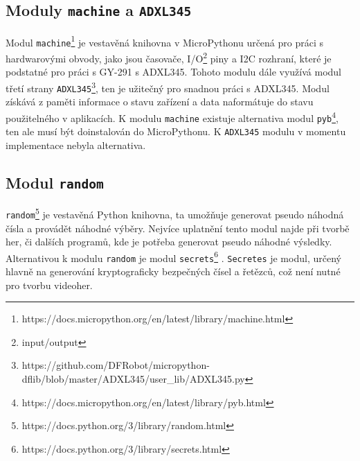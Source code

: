 \documentclass[12pt]{report}			%
\begin{document}
\subsection{Moduly \texttt{machine} a \texttt{ADXL345}}
Modul \texttt{machine}\footnote{https://docs.micropython.org/en/latest/library/machine.html} je vestavěná knihovna v MicroPythonu určená pro práci s hardwarovými obvody, jako jsou časovače, I/O\footnote{input/output} piny a I2C rozhraní, které je podstatné pro práci s GY-291 s ADXL345. Tohoto modulu dále využívá modul třetí strany 
\texttt{ADXL345}\footnote{https://github.com/DFRobot/micropython-dflib/blob/master/ADXL345/user\_lib/ADXL345.py}, ten je užitečný pro snadnou práci s ADXL345. Modul získává z paměti informace o stavu zařízení a data naformátuje do stavu použitelného v aplikacích. K modulu \texttt{machine} existuje alternativa modul \texttt{pyb}\footnote{https://docs.micropython.org/en/latest/library/pyb.html}, ten ale musí být doinstalován do MicroPythonu. K \texttt{ADXL345} modulu v momentu implementace nebyla alternativa. 

\subsection{Modul \texttt{random}}
\texttt{random}\footnote{https://docs.python.org/3/library/random.html} je vestavěná Python knihovna, ta umožňuje generovat pseudo náhodná čísla a provádět náhodné výběry. Nejvíce uplatnění tento modul najde při tvorbě her, či dalších programů, kde je potřeba generovat pseudo náhodné výsledky. 
\\
Alternativou k modulu \texttt{random} je modul
 \texttt{secrets}\footnote{https://docs.python.org/3/library/secrets.html} 
 . \texttt{Secretes} je modul, určený hlavně na generování kryptograficky bezpečných čísel a řetězců, což není nutné pro tvorbu videoher. 
 
\end{document}

